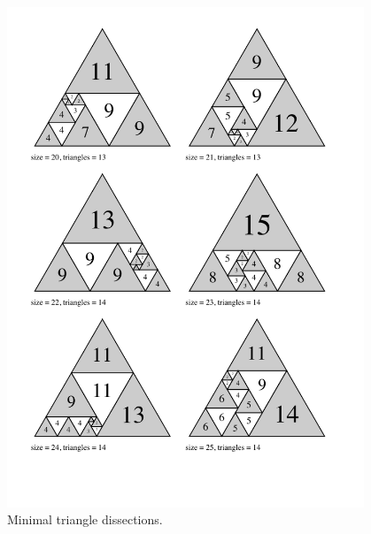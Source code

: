 \begin{figure}[htb]
\centering
\includegraphics[trim=2em 4em 3em 2em, width=0.95\textwidth]{img/tranquility4.pdf}
\caption{Minimal triangle dissections.}
\end{figure}

